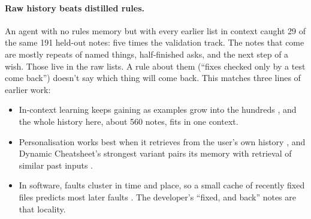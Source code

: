 \documentclass[10pt]{article}
\begin{document}
\paragraph{Raw history beats distilled rules.} An agent with no rules memory but with every earlier list in context caught 29 of the same 191 held-out notes: five times the validation track. The notes that come are mostly repeats of named things, half-finished asks, and the next step of a wish. Those live in the raw lists. A rule about them (``fixes checked only by a test come back'') doesn't say which thing will come back. This matches three lines of earlier work:
\begin{itemize}[leftmargin=*]
  \item In-context learning keeps gaining as examples grow into the hundreds \citep{agarwal2024manyshot}, and the whole history here, about 560 notes, fits in one context.
  \item Personalisation works best when it retrieves from the user's own history \citep{salemi2024lamp, gao2024aligning}, and Dynamic Cheatsheet's strongest variant pairs its memory with retrieval of similar past inputs \citep{suzgun2026dynamic}.
  \item In software, faults cluster in time and place, so a small cache of recently fixed files predicts most later faults \citep{kim2007predicting}. The developer's ``fixed, and back'' notes are that locality.
\end{itemize}
\end{document}

